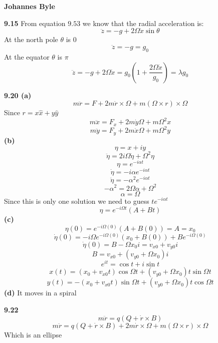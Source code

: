 \documentclass[english]{article}
\begin{document}
\begin{multicols*}{2}
\textbf{Johannes Byle}\\
\newcommand{\Lagr}{\mathcal{L}}

\noindent
\textbf{9.15}
From equation $9.53$ we know that the radial acceleration is:
$$\ddot{z}=-g+2\Omega\dot{x}\sin\theta$$
At the north pole $\theta$ is 0
$$\ddot{z}=-g=g_0$$
At the equator $\theta$ is $\pi$
$$\ddot{z}=-g+2\Omega\dot{x}=g_0(1+\frac{2\Omega\dot{x}}{g_0})=\lambda g_0$$

\noindent
\textbf{9.20 (a)}
$$m\ddot{r}=F+2m\dot{r}\times\Omega+m(\Omega\times r)\times\Omega$$
Since $r=x\hat{x}+y\hat{y}$
$$m\ddot{x}=F_x+2m\dot{y}\Omega+m\Omega^2x$$
$$m\ddot{y}=F_y+2m\dot{x}\Omega+m\Omega^2y$$
\textbf{(b)}
$$\eta=x+iy$$
$$\ddot{\eta}=2i\Omega\dot{\eta}+\Omega^2\eta$$
$$\eta=e^{-i\alpha t}$$
$$\dot{\eta}=-i\alpha e^{-i\alpha t}$$
$$\ddot{\eta}=-\alpha^2 e^{-i\alpha t}$$
$$-\alpha^2=2\Omega\alpha+\Omega^2$$
$$\alpha=\Omega$$
Since this is only one solution we need to guess $te^{-i\alpha t}$
$$\eta=e^{-i\Omega t}(A+Bt)$$
\textbf{(c)}
$$\eta(0)=e^{-i\Omega (0)}(A+B(0))=A=x_0$$
$$\dot{\eta}(0)=-i\Omega e^{-i\Omega (0)}(x_0+B(0))+Be^{-i\Omega (0)}$$
$$\dot{\eta}(0)=B-\Omega x_0i=v_{x0}+v_{y0}i$$
$$B=v_{x0}+(v_{y0}+\Omega x_0)i$$
$$e^{it}=\cos t+i\sin t$$
$$x(t)=(x_0+v_{x0}t)\cos\Omega t+(v_{y0}+\Omega x_0)t\sin\Omega t$$
$$y(t)=-(x_0+v_{x0}t)\sin\Omega t+(v_{y0}+\Omega x_0)t\cos\Omega t$$
\textbf{(d)}
It moves in a spiral

\noindent
\textbf{9.22}
$$m\ddot{r}=q(Q+\dot{r}\times B)$$
$$m\ddot{r}=q(Q+\dot{r}\times B)+2m\dot{r}\times\Omega+m(\Omega\times r)\times\Omega$$
Which is an ellipse

\end{multicols*}
\end{document}
